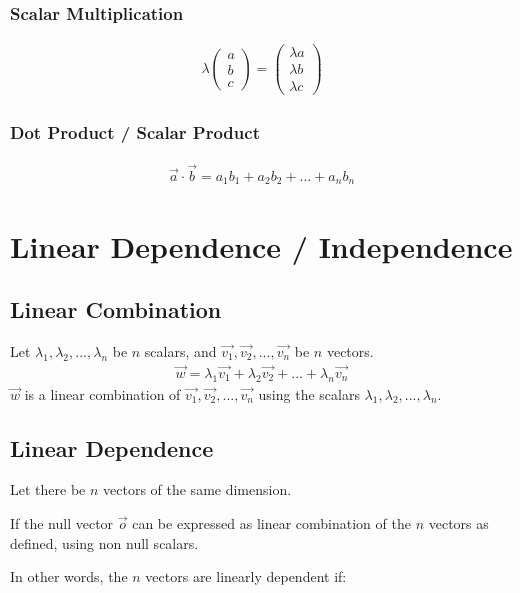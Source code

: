 \documentclass{article}
\begin{document}
\subsubsection{Scalar Multiplication}
\begin{align*}
    \lambda
    \begin{pmatrix}
        a \\ b \\ c
    \end{pmatrix}
    =
    \begin{pmatrix}
        \lambda a \\ \lambda b \\ \lambda c
    \end{pmatrix}
\end{align*}
\subsubsection{Dot Product / Scalar Product}
\begin{align*}
    \vec{a} \cdot \vec{b} = a_1 b_1 + a_2 b_2 + ... + a_n b_n
\end{align*}
\section{Linear Dependence / Independence}
\subsection{Linear Combination}
Let $ \lambda_1, \lambda_2, ... , \lambda_n $ be $n$ scalars, and $ \vec{v_1}, \vec{v_2}, ..., \vec{v_n} $ be $n$ vectors.
\begin{align*}
    \vec{w} = \lambda_1 \vec{v_1} + \lambda_2 \vec{v_2} + ... + \lambda_n \vec{v_n}
\end{align*}
$ \vec{w} $ is a linear combination of $ \vec{v_1}, \vec{v_2}, ..., \vec{v_n} $ using the scalars $ \lambda_1, \lambda_2, ... , \lambda_n $.

\subsection{Linear Dependence}

Let there be $n$ vectors of the same dimension.

If the null vector $ \vec{o} $ can be expressed as linear combination of the $n$ vectors as defined, using non null scalars.

In other words, the $n$ vectors are linearly dependent if:
\end{document}
